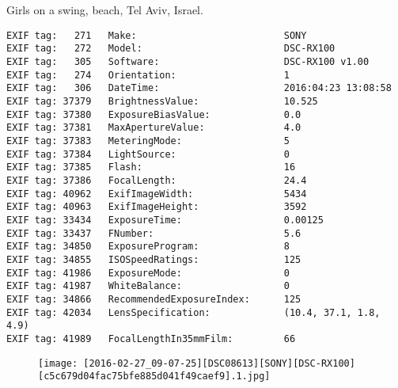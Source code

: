 \section{\protect{}}
\noindent Girls on a swing, beach, Tel Aviv, Israel.
\noindent
\begin{lstlisting}
EXIF tag:   271   Make:                          SONY
EXIF tag:   272   Model:                         DSC-RX100
EXIF tag:   305   Software:                      DSC-RX100 v1.00
EXIF tag:   274   Orientation:                   1
EXIF tag:   306   DateTime:                      2016:04:23 13:08:58
EXIF tag: 37379   BrightnessValue:               10.525
EXIF tag: 37380   ExposureBiasValue:             0.0
EXIF tag: 37381   MaxApertureValue:              4.0
EXIF tag: 37383   MeteringMode:                  5
EXIF tag: 37384   LightSource:                   0
EXIF tag: 37385   Flash:                         16
EXIF tag: 37386   FocalLength:                   24.4
EXIF tag: 40962   ExifImageWidth:                5434
EXIF tag: 40963   ExifImageHeight:               3592
EXIF tag: 33434   ExposureTime:                  0.00125
EXIF tag: 33437   FNumber:                       5.6
EXIF tag: 34850   ExposureProgram:               8
EXIF tag: 34855   ISOSpeedRatings:               125
EXIF tag: 41986   ExposureMode:                  0
EXIF tag: 41987   WhiteBalance:                  0
EXIF tag: 34866   RecommendedExposureIndex:      125
EXIF tag: 42034   LensSpecification:             (10.4, 37.1, 1.8, 4.9)
EXIF tag: 41989   FocalLengthIn35mmFilm:         66

\end{lstlisting}
\clearpage
\begin{figure}
\raggedleft
\texttt{[image: [2016-02-27\_09-07-25][DSC08613][SONY][DSC-RX100][c5c679d04fac75bfe885d041f49caef9].1.jpg]}
\end{figure}


\clearpage
